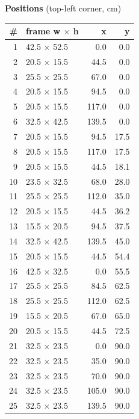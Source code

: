 \documentclass[a4paper,landscape,10pt]{article}
\begin{document}
\begin{minipage}[t]{0.25\textwidth}
\vspace{8pt}
{\bfseries Positions} (top-left corner, cm)\\[2pt]
\tiny
\begin{tabular}{@{}r l r r@{}}
\toprule
\# & frame w $\times$ h & x & y \\
\midrule
1 & 42.5 $\times$ 52.5 & 0.0 & 0.0 \\
2 & 20.5 $\times$ 15.5 & 44.5 & 0.0 \\
3 & 25.5 $\times$ 25.5 & 67.0 & 0.0 \\
4 & 20.5 $\times$ 15.5 & 94.5 & 0.0 \\
5 & 20.5 $\times$ 15.5 & 117.0 & 0.0 \\
6 & 32.5 $\times$ 42.5 & 139.5 & 0.0 \\
7 & 20.5 $\times$ 15.5 & 94.5 & 17.5 \\
8 & 20.5 $\times$ 15.5 & 117.0 & 17.5 \\
9 & 20.5 $\times$ 15.5 & 44.5 & 18.1 \\
10 & 23.5 $\times$ 32.5 & 68.0 & 28.0 \\
11 & 25.5 $\times$ 25.5 & 112.0 & 35.0 \\
12 & 20.5 $\times$ 15.5 & 44.5 & 36.2 \\
13 & 15.5 $\times$ 20.5 & 94.5 & 37.5 \\
14 & 32.5 $\times$ 42.5 & 139.5 & 45.0 \\
15 & 20.5 $\times$ 15.5 & 44.5 & 54.4 \\
16 & 42.5 $\times$ 32.5 & 0.0 & 55.5 \\
17 & 25.5 $\times$ 25.5 & 84.5 & 62.5 \\
18 & 25.5 $\times$ 25.5 & 112.0 & 62.5 \\
19 & 15.5 $\times$ 20.5 & 67.0 & 65.0 \\
20 & 20.5 $\times$ 15.5 & 44.5 & 72.5 \\
21 & 32.5 $\times$ 23.5 & 0.0 & 90.0 \\
22 & 32.5 $\times$ 23.5 & 35.0 & 90.0 \\
23 & 32.5 $\times$ 23.5 & 70.0 & 90.0 \\
24 & 32.5 $\times$ 23.5 & 105.0 & 90.0 \\
25 & 32.5 $\times$ 23.5 & 139.5 & 90.0 \\
\bottomrule
\end{tabular}
\end{minipage}
\clearpage
\end{document}

